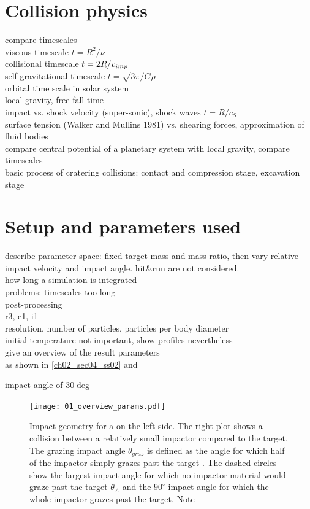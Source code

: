 \section{Collision physics}
compare timescales\\
viscous timescale $t = R^2 / \nu$ \\
collisional timescale $t = 2 R / v_{imp}$ \\
self-gravitational timescale $t = \sqrt{3\pi / G \rho}$ \\
orbital time scale in solar system \\
local gravity, free fall time \\
impact vs. shock velocity (super-sonic), shock waves $t = R / c_S $ \\
surface tension (Walker and Mullins 1981) vs. shearing forces, approximation of fluid bodies \\
compare central potential of a planetary system with local gravity, compare timescales \\
basic process of cratering collisions: contact and compression stage, excavation stage \cite{Melosh:2007p3502} \\


\section{Setup and parameters used}
describe parameter space: fixed target mass and mass ratio, then vary relative impact velocity and impact angle. hit\&run are not considered. \\
how long a simulation is integrated \\
problems: timescales too long\\
post-processing \\
r3, c1, i1 \\
resolution, number of particles, particles per body diameter \\
initial temperature not important, show profiles nevertheless \\
give an overview of the result parameters\\

as shown in \ref{ch02_sec04_ss02} and \label{ch02_sec04_ss04}



impact angle of $30\deg$



\begin{figure}[htbp]
\begin{center}
\texttt{[image: 01\_overview\_params.pdf]}
\caption{Impact geometry for a \SSC on the left side. The right plot shows a collision between a relatively small impactor compared to the target. The grazing impact angle $\theta_{graz}$ is defined as the angle for which half of the impactor simply grazes past the target \citep{Asphaug:2010p3539}. The dashed circles show the largest impact angle for which no impactor material would graze past the target $\theta_A$ and the $90^\circ$ impact angle for which the whole impactor grazes past the target. Note }
\label{ch03_fig01}
\end{center}
\end{figure}

